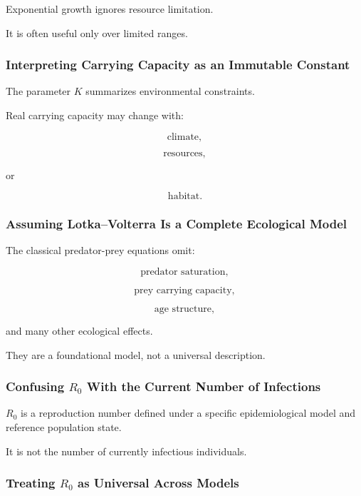 Exponential growth ignores resource limitation.

It is often useful only over limited ranges.

\subsubsection{Interpreting Carrying Capacity as an Immutable Constant}

The parameter \(K\) summarizes environmental constraints.

Real carrying capacity may change with:

\[
\boxed{
\text{climate},
}
\]

\[
\boxed{
\text{resources},
}
\]

or

\[
\boxed{
\text{habitat}.
}
\]

\subsubsection{Assuming Lotka--Volterra Is a Complete Ecological Model}

The classical predator-prey equations omit:

\[
\boxed{
\text{predator saturation},
}
\]

\[
\boxed{
\text{prey carrying capacity},
}
\]

\[
\boxed{
\text{age structure},
}
\]

and many other ecological effects.

They are a foundational model, not a universal description.

\subsubsection{Confusing \(R_0\) With the Current Number of Infections}

\(R_0\) is a reproduction number defined under a specific epidemiological
model and reference population state.

It is not the number of currently infectious individuals.

\subsubsection{Treating \(R_0\) as Universal Across Models}

